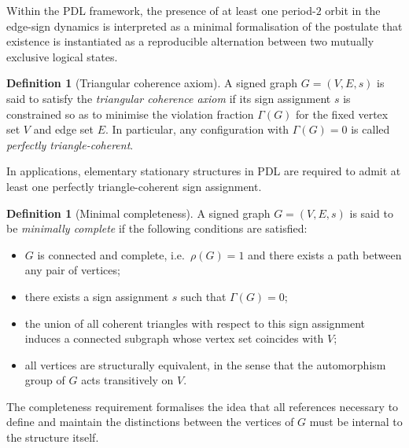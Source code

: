 \documentclass[11pt,a4paper]{article}
\theoremstyle{definition}
\newtheorem{definition}[theorem]{Definition}
\begin{document}
Within the PDL framework, the presence of at least one period-$2$ orbit in the edge-sign dynamics is interpreted as a minimal formalisation of the postulate that existence is instantiated as a reproducible alternation between two mutually exclusive logical states.\cite{PDL_Intro_2026,PDL_Main_2026,PDL_TO_Dialogue_2026}

\begin{definition}[Triangular coherence axiom]
\label{def:triangular_coherence_axiom}
A signed graph $G=(V,E,s)$ is said to satisfy the \emph{triangular coherence axiom} if its sign assignment $s$ is constrained so as to minimise the violation fraction $\Gamma(G)$ for the fixed vertex set $V$ and edge set $E$.\cite{PDL_Main_2026,PDL_TO_Dialogue_2026} In particular, any configuration with $\Gamma(G)=0$ is called \emph{perfectly triangle-coherent}.
\end{definition}

In applications, elementary stationary structures in PDL are required to admit at least one perfectly triangle-coherent sign assignment.\cite{PDL_Main_2026}

\begin{definition}[Minimal completeness]
\label{def:minimal_completeness}
A signed graph $G=(V,E,s)$ is said to be \emph{minimally complete} if the following conditions are satisfied:
\begin{itemize}
  \item $G$ is connected and complete, i.e.\ $\rho(G)=1$ and there exists a path between any pair of vertices;
  \item there exists a sign assignment $s$ such that $\Gamma(G)=0$;
  \item the union of all coherent triangles with respect to this sign assignment induces a connected subgraph whose vertex set coincides with $V$;
  \item all vertices are structurally equivalent, in the sense that the automorphism group of $G$ acts transitively on $V$.
\end{itemize}
\end{definition}

The completeness requirement formalises the idea that all references necessary to define and maintain the distinctions between the vertices of $G$ must be internal to the structure itself.\cite{PDL_Intro_2026,PDL_Main_2026,PDL_TO_Dialogue_2026}
\end{document}
